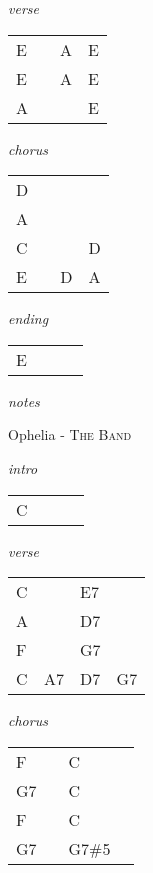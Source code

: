 \documentclass[12pt]{article}
\begin{document}
\textit{verse}

\begin{tabular}{|P{1.25in}|P{1.25in}|P{1.25in}|P{1.25in}|}
  E &   & A  &  E \\
  E &   & A  &  E \\
  A &   &   & E  \\
\end{tabular}

\textit{chorus}

\begin{tabular}{|P{1.25in}|P{1.25in}|P{1.25in}|P{1.25in}|}
  D &   &   &   \\
  A &   &   &   \\
  C &   &   & D  \\
  E &   &  D &  A \\
\end{tabular}

\textit{ending}

\begin{tabular}{|P{1.25in}|P{1.25in}|P{1.25in}|P{1.25in}|}
  E &   &   &   \\
\end{tabular}

\textit{notes}



\newpage

{\Huge Ophelia} {\huge - \textsc{The Band}}

\huge
\textit{intro}

\begin{tabular}{|P{1.25in}|P{1.25in}|P{1.25in}|P{1.25in}|}
  C &   &   &   \\
\end{tabular}

\textit{verse}

\begin{tabular}{|P{1.25in}|P{1.25in}|P{1.25in}|P{1.25in}|}
  C &   & E7  &   \\
  A &   & D7  &   \\
  F &   &  G7 &   \\
  C &  A7 &  D7 &  G7 \\
\end{tabular}

\textit{chorus}

\begin{tabular}{|P{1.25in}|P{1.25in}|P{1.25in}|P{1.25in}|}
  F &   & C  &   \\
  G7 &   & C  &   \\
  F &   & C  &   \\
  G7 &   & G7\#5  &   \\
\end{tabular}
\end{document}
